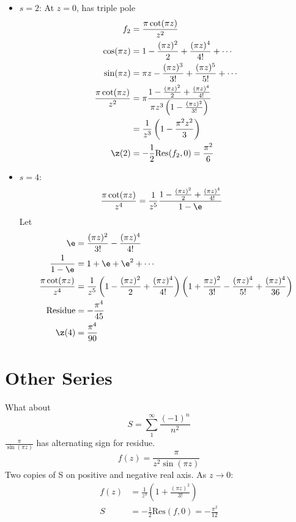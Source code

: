 \documentclass[a4paper, 11pt, normalem]{report}
\begin{document}
\begin{itemize}
    \item $s=2$: At $z=0$, has triple pole 
        \begin{align} 
            f_2 &= \frac{\pi\cot(\pi z)}{z^2} \\
            \cos(\pi z) &= 1 - \frac{(\pi z)^2}{2} + \frac{(\pi z)^4}{4!} + \cdots \\
            \sin(\pi z) &= \pi z - \frac{(\pi z)^3}{3!} + \frac{(\pi z)^5}{5!} + \cdots \\
            \frac{\pi\cot(\pi z)}{z^2} &= \pi\frac{1 - \frac{(\pi z)^2}{2} + \frac{(\pi z)^4}{4!}}{\pi z^3\left(1 - \frac{(\pi z)^2}{3!}\right)} \\
                                       &= \frac{1}{z^3}\left(1 - \frac{\pi^2z^2}{3}\right) \\
            \z(2) &= -\frac{1}{2}\text{Res}(f_2,0) = \frac{\pi^2}{6}
        \end{align}
    \item $s=4$:
        \begin{align}
            \frac{\pi\cot(\pi z)}{z^4} &= \frac{1}{z^5}\frac{1 - \frac{(\pi z)^2}{2} + \frac{(\pi z)^4}{4!}}{1 - \e} 
        \end{align}
        Let 
        \begin{align}
            \e &= \frac{(\pi z)^2}{3!} - \frac{(\pi z)^4}{4!} \\
            \frac{1}{1-\e} &= 1 + \e + \e^2 + \cdots \\
            \frac{\pi\cot(\pi z)}{z^4} &= \frac{1}{z^5}\left(1 - \frac{(\pi z)^2}{2} + \frac{(\pi z)^4}{4!} \right)\left(1 + \frac{\pi z)^2}{3!} - \frac{(\pi z)^4}{5!} + \frac{(\pi z)^4}{36} \right) \\
            \text{Residue} &= -\frac{\pi^4}{45} \\
            \z(4) &= \frac{\pi^4}{90}
        \end{align}
\end{itemize}

\section{Other Series}
What about 
\begin{equation}
    S = \sum_1^\infty \frac{(-1)^n}{n^2}
\end{equation}
$\frac{\pi}{\sin(\pi z)}$ has alternating sign for residue. 
\begin{equation}
    f(z) = \frac{\pi}{z^2\sin(\pi z)}
\end{equation}
Two copies of S on positive and negative real axis. 
As $z \to 0$:
\begin{align}
    f(z) &= \frac{1}{z^3}\left(1 + \frac{(\pi z)^2}{3!}\right) \\
    S &= -\frac{1}{2}\text{Res}(f,0) = -\frac{\pi^2}{12}
\end{align}
\end{document}

